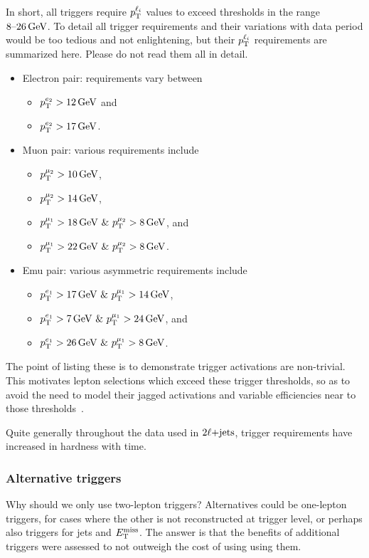 In short, all triggers require $\pt^{\ell_i}$ values to exceed thresholds in
the range $8\textrm{--}26\,\eV[G]$.
To detail all trigger requirements and their variations with data period
would be too tedious and not enlightening, but their $\pt^{\ell_i}$ requirements
are summarized here.
Please do not read them all in detail.
\begin{itemize}
\item Electron pair: requirements vary between
\begin{itemize}
\item $\pt^{e_2} > 12\,\eV[G]$ and
\item $\pt^{e_2} > 17\,\eV[G]$.
\end{itemize}
\item Muon pair: various requirements include
\begin{itemize}
\item $\pt^{\mu_2} > 10\,\eV[G]$,
\item $\pt^{\mu_2} > 14\,\eV[G]$,
\item $\pt^{\mu_1} > 18\,\eV[G]~\&~\pt^{\mu_2} > 8\,\eV[G]$, and
\item $\pt^{\mu_1} > 22\,\eV[G]~\&~\pt^{\mu_2} > 8\,\eV[G]$.
\end{itemize}
\item Emu pair: various asymmetric requirements include
\begin{itemize}
\item $\pt^{e_1} > 17\,\eV[G]~\&~\pt^{\mu_1} > 14\,\eV[G]$,
\item $\pt^{e_1} > 7\,\eV[G]~\&~\pt^{\mu_1} > 24\,\eV[G]$, and
\item $\pt^{e_1} > 26\,\eV[G]~\&~\pt^{\mu_1} > 8\,\eV[G]$.
\end{itemize}
\end{itemize}
The point of listing these is to demonstrate trigger activations are
non-trivial.
This motivates lepton selections which exceed these trigger thresholds,
so as to avoid the need to model their jagged activations and variable
efficiencies near to those thresholds~\cite{
atlas_trigger_egamma_run2,
atlas_trigger_muon_run2
}.

Quite generally throughout the data used in $\twoljets$, trigger requirements
have increased in hardness with time.


\subsubsection{Alternative triggers}
Why should we only use two-lepton triggers?
Alternatives could be one-lepton triggers, for cases where the other is not
reconstructed at trigger level, or perhaps also triggers for jets and $\met$.
The answer is that the benefits of additional triggers were assessed to not
outweigh the cost of using using them.

